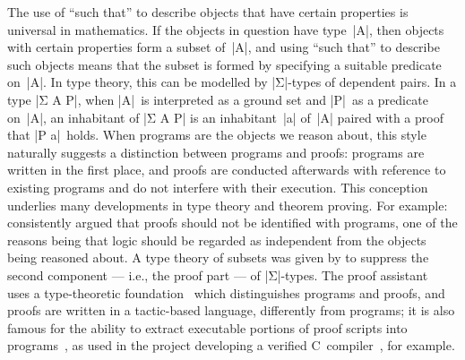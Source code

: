 The use of ``such that'' to describe objects that have certain properties is universal in mathematics.
If the objects in question have type~|A|, then objects with certain properties form a subset of~|A|, and using ``such that'' to describe such objects means that the subset is formed by specifying a suitable predicate on~|A|.
In type theory, this can be modelled by |Σ|-types of dependent pairs.
In a type |Σ A P|, when |A|~is interpreted as a ground set and |P|~as a predicate on~|A|, an inhabitant of |Σ A P| is an inhabitant~|a| of~|A| paired with a proof that |P a|~holds.
When programs are the objects we reason about, this style naturally suggests a distinction between programs and proofs: programs are written in the first place, and proofs are conducted afterwards with reference to existing programs and do not interfere with their execution.
This conception underlies many developments in type theory and theorem proving.
For example: \citet{Luo-type-theory} consistently argued that proofs should not be identified with programs, one of the reasons being that logic should be regarded as independent from the objects being reasoned about.
A type theory of subsets was given by \citet{Nordstrom-programming} to suppress the second component --- i.e., the proof part --- of |Σ|-types.
The proof assistant ~\citep{Bertot-Coq} uses a type-theoretic foundation~\citep{Coquand-calculus-of-constructions, Coquand-CiC} which distinguishes programs and proofs, and proofs are written in a tactic-based language, differently from programs; it is also famous for the ability to extract executable portions of proof scripts into programs~\citep{Paulin-Mohring-extraction, Letouzey-Coq-extraction}, as used in the  project developing a verified C~compiler~\citep{Leroy-CompCert}, for example.

